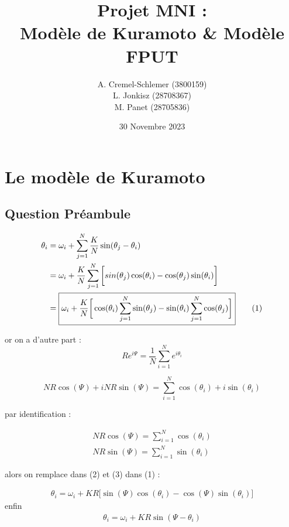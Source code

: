 \documentclass[a4paper, 11pt]{article}
\title{Projet MNI : \\ Modèle de Kuramoto \& Modèle FPUT}
\author{A. Cremel-Schlemer (3800159) \\ L. Jonkisz (28708367) \\ M. Panet (28705836)}
\date{30 Novembre 2023}
\begin{document}
\maketitle
\section{Le modèle de Kuramoto}
\subsection*{Question Préambule}
\begin{align*}
    \theta_{i} &=\omega_{i} + \displaystyle \sum_{j=1}^{N} \frac{K}{N} \sin(\theta_{j} - \theta_{i}) \\
    &=\omega_{i} +  \frac{K}{N} \displaystyle \sum_{j=1}^{N} \bigg[ sin(\theta_{j})\cos(\theta_{i}) - \cos(\theta_{j})\sin(\theta_{i}) \bigg] \\
   &=\boxed{\omega_{i} +  \frac{K}{N} \bigg[ \cos(\theta_{i}) \displaystyle \sum_{j=1}^{N} \sin(\theta_{j}) -\sin(\theta_{i}) \displaystyle \sum_{j=1}^{N}\cos(\theta_{j})\bigg] } \refstepcounter{equation}\tag{\theequation}
\end{align*}

or on a d'autre part : 
\begin{equation*}
    R e^{i\Psi} = \frac{1}{N} \displaystyle \sum_{i=1}^{N} e^{i\theta_{i}}
\end{equation*}

\begin{equation*}
    NR \cos (\Psi) + i NR \sin (\Psi)  = \displaystyle \sum_{i=1}^{N} \cos(\theta_{i}) + i \sin(\theta_{i}) 
\end{equation*}

par identification : 

\begin{align}
 \boxed{ NR \cos (\Psi) =  \displaystyle \sum_{i=1}^{N} \cos(\theta_{i}) } \\
 \boxed{ NR \sin (\Psi) =  \displaystyle \sum_{i=1}^{N} \sin(\theta_{i}) }
\end{align}


alors on remplace dans (2) et (3) dans (1) : 

\begin{align*}
    \theta_{i} =\omega_{i} +  KR \bigg[\sin(\Psi)\cos(\theta_{i}) -\cos(\Psi)\sin(\theta_{i})\bigg]
\end{align*}
enfin
\begin{align*}
    \boxed{\theta_{i} =\omega_{i} +  KR\sin(\Psi - \theta_{i})}
\end{align*}
\end{document}
